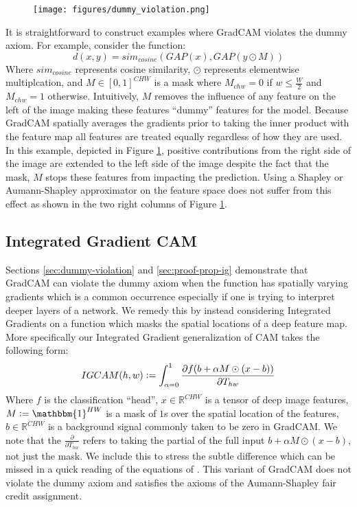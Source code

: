 \documentclass{article} %
\newcommand{\defeq}{\vcentcolon=}
\begin{document}
\begin{figure}[h]
\centering
\texttt{[image: figures/dummy\_violation.png]}
\label{fig:dummy-violation}
\end{figure}


It is straightforward to construct examples where GradCAM violates the dummy axiom. For example, consider the function:
$$d(x,y) = sim_{cosine}(GAP(x), GAP(y \odot M))$$
Where $sim_{cosine}$ represents cosine similarity, $\odot$ represents elementwise multiplcation, and $M\in [0,1]^{CHW}$ is a mask where $M_{chw} = 0$ if $w \leq \frac{W}{2}$ and $M_{chw}=1$ otherwise. Intuitively, $M$ removes the influence of any feature on the left of the image making these features ``dummy'' features for the model. Because GradCAM spatially averages the gradients prior to taking the inner product with the feature map all features are treated equally regardless of how they are used. In this example, depicted in Figure \ref{fig:dummy-violation}, positive contributions from the right side of the image are extended to the left side of the image despite the fact that the mask, $M$ stops these features from impacting the prediction. Using a Shapley or Aumann-Shapley approximator on the feature space does not suffer from this effect as shown in the two right columns of Figure \ref{fig:dummy-violation}.


\subsection{Integrated Gradient CAM}

Sections \ref{sec:dummy-violation} and \ref{sec:proof-prop-ig} demonstrate that GradCAM can violate the dummy axiom when the function has spatially varying gradients which is a common occurrence especially if one is trying to interpret deeper layers of a network. We remedy this by instead considering Integrated Gradients on a function which masks the spatial locations of a deep feature map. More specifically our Integrated Gradient generalization of CAM takes the following form:
\begin{equation}
    IGCAM(h,w) \defeq \int_{\alpha=0}^1 \frac{\partial f(b + \alpha M \odot (x - b))}{\partial T_{hw}}
\end{equation}
Where $f$ is the classification ``head'', $x \in \mathbb{R}^{CHW}$ is a tensor of deep image features, $M \defeq \mathbbm{1}^{HW}$ is a mask of $1$s over the spatial location of the features, $b \in \mathbb{R}^{CHW}$ is a background signal commonly taken to be zero in GradCAM. We note that the $\frac{\partial}{\partial T_{hw}}$ refers to taking the partial of the full input $b + \alpha M \odot (x - b)$, not just the mask. We include this to stress the subtle difference which can be missed in a quick reading of the equations of \cite{integrated-gradients}. This variant of GradCAM does not violate the dummy axiom and satisfies the axioms of the Aumann-Shapley fair credit assignment.
\end{document}
